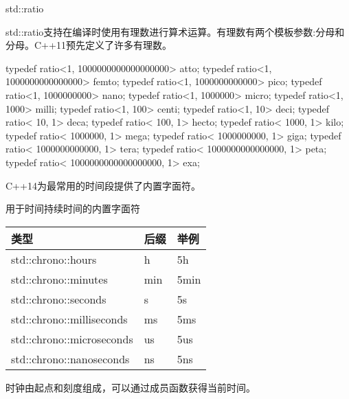 \begin{myNotic}{std::ratio}
	
std::ratio支持在编译时使用有理数进行算术运算。有理数有两个模板参数:分母和分母。C++11预先定义了许多有理数。
	
\begin{cpp}
typedef ratio<1, 1000000000000000000> atto;
typedef ratio<1, 1000000000000000> femto;
typedef ratio<1, 1000000000000> pico;
typedef ratio<1, 1000000000> nano;
typedef ratio<1, 1000000> micro;
typedef ratio<1, 1000> milli;
typedef ratio<1, 100> centi;
typedef ratio<1, 10> deci;
typedef ratio< 10, 1> deca;
typedef ratio< 100, 1> hecto;
typedef ratio< 1000, 1> kilo;
typedef ratio< 1000000, 1> mega;
typedef ratio< 1000000000, 1> giga;
typedef ratio< 1000000000000, 1> tera;
typedef ratio< 1000000000000000, 1> peta;
typedef ratio< 1000000000000000000, 1> exa;
\end{cpp}
	
\end{myNotic}

C++14为最常用的时间段提供了内置字面符。

\begin{center}
用于时间持续时间的内置字面符
\end{center}

\begin{longtable}[c]{|l|l|l|}
\hline
\textbf{类型}             & \textbf{后缀} & \textbf{举例} \\ \hline
\endfirsthead
%
\endhead
%
std::chrono::hours        & h               & 5h               \\ \hline
std::chrono::minutes      & min             & 5min             \\ \hline
std::chrono::seconds      & s               & 5s               \\ \hline
std::chrono::milliseconds & ms              & 5ms              \\ \hline
std::chrono::microseconds & us              & 5us              \\ \hline
std::chrono::nanoseconds  & ns              & 5ns             \\ \hline
\end{longtable}


时钟由起点和刻度组成，可以通过成员函数获得当前时间。


